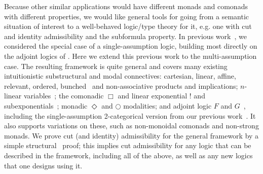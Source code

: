 Because other similar applications would have different monads and
comonads with different properties, we would like general tools for
going from a semantic situation of interest to a well-behaved logic/type
theory for it, e.g. one with cut and identity admissibility and the
subformula property. In previous work~\citep{ls16adjoint}, we considered
the special case of a single-assumption logic, building most directly on
the adjoint logics of
\citet{benton94mixed,bentonwadler96adjoint,reed09adjoint}.  Here we
extend this previous work to the multi-assumption case.  The resulting
framework is quite general and covers many existing intuitionistic
substructural and modal connectives: cartesian, linear, affine,
relevant, ordered, bunched~\citep{ohearnpym99bunched} and
non-associative products and implications; $n$-linear
variables~\citep{reed08namessubstructural}; the comonadic $\Box$ and
linear exponential $!$ and
subexponentials~\citep{nigammiller09subexponentials,danos+93subexponentials};
monadic $\Diamond$ and $\bigcirc$ modalities; and adjoint logic $F$ and
$G$~\citep{benton94mixed,bentonwadler96adjoint,reed09adjoint}, including
the single-assumption 2-categorical version from our previous
work~\citep{ls16adjoint}.  It also supports variations on these, such as
non-monoidal comonads and non-strong monads.  We prove cut (and
identity) admissibility for the general framework by a simple
structural~\citep{pfenning94cut} proof; this implies cut admissibility
for any logic that can be described in the framework, including all of
the above, as well as any new logics that one designs using it.

